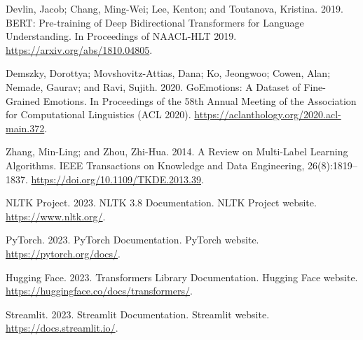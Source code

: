 \documentclass[12pt,a4paper]{report}
\begin{document}
\begin{thebibliography}{7}

 Devlin, Jacob; Chang, Ming-Wei; Lee, Kenton; and Toutanova, Kristina. 2019. BERT: Pre-training of Deep Bidirectional Transformers for Language Understanding. In Proceedings of NAACL-HLT 2019. \url{https://arxiv.org/abs/1810.04805}.

 Demszky, Dorottya; Movshovitz-Attias, Dana; Ko, Jeongwoo; Cowen, Alan; Nemade, Gaurav; and Ravi, Sujith. 2020. GoEmotions: A Dataset of Fine-Grained Emotions. In Proceedings of the 58th Annual Meeting of the Association for Computational Linguistics (ACL 2020). \url{https://aclanthology.org/2020.acl-main.372}.

 Zhang, Min-Ling; and Zhou, Zhi-Hua. 2014. A Review on Multi-Label Learning Algorithms. IEEE Transactions on Knowledge and Data Engineering, 26(8):1819–1837. \url{https://doi.org/10.1109/TKDE.2013.39}.

 NLTK Project. 2023. NLTK 3.8 Documentation. NLTK Project website. \url{https://www.nltk.org/}.

 PyTorch. 2023. PyTorch Documentation. PyTorch website. \url{https://pytorch.org/docs/}.

 Hugging Face. 2023. Transformers Library Documentation. Hugging Face website. \url{https://huggingface.co/docs/transformers/}.

 Streamlit. 2023. Streamlit Documentation. Streamlit website. \url{https://docs.streamlit.io/}.

\end{thebibliography}
\end{document}
